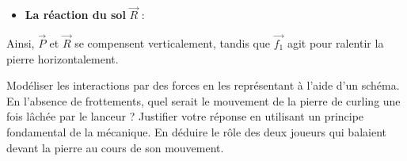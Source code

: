 \documentclass[answers]{exam}
\begin{document}
\begin{questions}
\begin{solution}
\begin{itemize}
        \item \textbf{La réaction du sol} $\vec{R}$ :  
    \end{itemize}
    
    Ainsi, $\vec{P}$ et $\vec{R}$ se compensent verticalement, tandis que $\vec{f_1}$ agit pour ralentir la pierre horizontalement.
    \end{solution}
  \question[2] Modéliser les interactions par des forces en les représentant à l’aide d’un schéma.
  \question[2] En l’absence de frottements, quel serait le mouvement de la pierre de curling une fois lâchée par le lanceur ? Justifier votre réponse en utilisant un principe fondamental de la mécanique.
  \question[2] En déduire le rôle des deux joueurs qui balaient devant la pierre au cours de son mouvement.
\end{questions}
\end{document}
